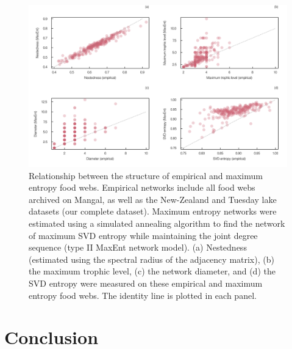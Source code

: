 \documentclass[10pt,oneside]{article}
\makeatletter
\def\maxwidth{\ifdim\Gin@nat@width>\linewidth\linewidth
\else\Gin@nat@width\fi}
\let\Oldincludegraphics\includegraphics
\renewcommand{\includegraphics}[1]{\Oldincludegraphics[width=\maxwidth]{#1}}
\makeatother
\begin{document}
\begin{figure}
\hypertarget{fig:measures}{%
\centering
\includegraphics{figures/measures_emp_maxent.png}
\caption{Relationship between the structure of empirical and maximum
entropy food webs. Empirical networks include all food webs archived on
Mangal, as well as the New-Zealand and Tuesday lake datasets (our
complete dataset). Maximum entropy networks were estimated using a
simulated annealing algorithm to find the network of maximum SVD entropy
while maintaining the joint degree sequence (type II MaxEnt network
model). (a) Nestedness (estimated using the spectral radius of the
adjacency matrix), (b) the maximum trophic level, (c) the network
diameter, and (d) the SVD entropy were measured on these empirical and
maximum entropy food webs. The identity line is plotted in each
panel.}\label{fig:measures}
}
\end{figure}

\hypertarget{conclusion}{%
\section{Conclusion}\label{conclusion}}
\end{document}
